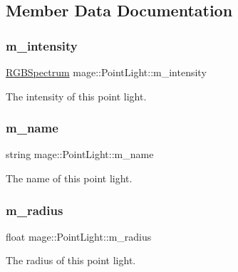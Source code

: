 \subsection{Member Data Documentation}
\hypertarget{classmage_1_1_point_light_ac021a08c4c700c3b19de5f7491a80e4f}{}\label{classmage_1_1_point_light_ac021a08c4c700c3b19de5f7491a80e4f} 
\subsubsection{\texorpdfstring{m\+\_\+intensity}{m\_intensity}}
{\footnotesize\ttfamily \hyperlink{structmage_1_1_r_g_b_spectrum}{R\+G\+B\+Spectrum} mage\+::\+Point\+Light\+::m\+\_\+intensity\hspace{0.3cm}{\ttfamily [private]}}

The intensity of this point light. \hypertarget{classmage_1_1_point_light_a96a5802cc2b06df700f63f8e8a9683eb}{}\label{classmage_1_1_point_light_a96a5802cc2b06df700f63f8e8a9683eb} 
\subsubsection{\texorpdfstring{m\+\_\+name}{m\_name}}
{\footnotesize\ttfamily string mage\+::\+Point\+Light\+::m\+\_\+name\hspace{0.3cm}{\ttfamily [private]}}

The name of this point light. \hypertarget{classmage_1_1_point_light_a04459adec2eaadc457799e4399b5df1f}{}\label{classmage_1_1_point_light_a04459adec2eaadc457799e4399b5df1f} 
\subsubsection{\texorpdfstring{m\+\_\+radius}{m\_radius}}
{\footnotesize\ttfamily float mage\+::\+Point\+Light\+::m\+\_\+radius\hspace{0.3cm}{\ttfamily [private]}}

The radius of this point light. 